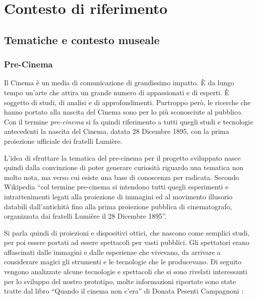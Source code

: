 \chapter {Contesto di riferimento}
\label{chap:contesto}

\section{Tematiche e contesto museale}
\label{sec:contesto_museale}

\subsection{Pre-Cinema}
\label{sec:precinema}

Il Cinema è un media di comunicazione di grandissimo impatto. È da lungo tempo un’arte che attira un grande numero di appassionati e di esperti. È soggetto di studi, di analisi e di approfondimenti.
Purtroppo però, le ricerche che hanno portato alla nascita del Cinema sono per lo più sconosciute al pubblico. 
Con il termine \textit{pre-cinema} si fa quindi riferimento a tutti quegli studi e tecnologie antecedenti la nascita del Cinema, datata 28 Dicembre 1895, con la prima proiezione ufficiale dei fratelli Lumière.

L’idea di sfruttare la tematica del pre-cinema per il progetto sviluppato nasce quindi dalla convinzione di poter generare curiosità riguardo una tematica non molto nota, ma verso cui esiste una base di conoscenza per radicata.
Secondo Wikipedia \cite{precinema_wikipedia} “col termine pre-cinema si intendono tutti quegli esperimenti e intrattenimenti legati alla proiezione di immagini ed al movimento illusorio databili dall’antichità fino alla prima proiezione pubblica di cinematografo, organizzata dai fratelli Lumière il 28 Dicembre 1895”. 

Si parla quindi di proiezioni e dispositivi ottici, che nascono come semplici studi, per poi essere portati ad essere spettacoli per vasti pubblici. Gli spettatori erano affascinati dalle immagini e dalle esperienze che vivevano, da arrivare a considerare magici gli strumenti e le tecnologie che le producevano.
Di seguito vengono analizzate alcune tecnologie e spettacoli che si sono rivelati interessanti per lo sviluppo del nostro prototipo, molte informazioni riportate sono state tratte dal libro “Quando il cinema non c’era” di Donata Pesenti Campagnoni \cite{quando_il_cinema_non_cera}:

